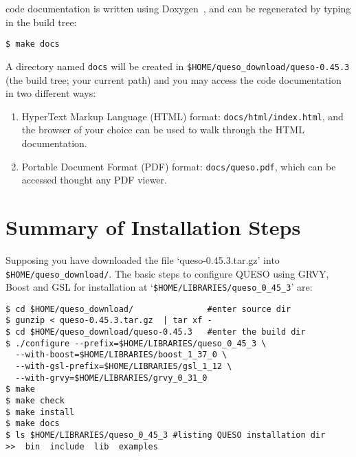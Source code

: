 \Queso{} code documentation is written using Doxygen~\cite{Doxygen}, and can be regenerated by typing in the build tree:
\begin{lstlisting}
$ make docs
\end{lstlisting}

A directory named \verb+docs+ will be created in \verb+$HOME/queso_download/queso-0.45.3+ (the build tree; your current path) and you may access the code documentation in two different ways:
\begin{enumerate}
 \item HyperText Markup Language (HTML)  format: \verb+docs/html/index.html+, and the browser of your choice can be used to walk through the HTML documentation.

\item Portable Document Format (PDF) format: \verb+docs/queso.pdf+, which can be accessed thought any PDF viewer.
\end{enumerate}
% 

\section{Summary of Installation Steps}\label{sec:summary}


Supposing you have downloaded the file `queso-0.45.3.tar.gz' into \texttt{\$HOME/queso\_download/}.
%
The basic steps to configure QUESO using GRVY, Boost and GSL for installation at \linebreak 
`\verb+$HOME/LIBRARIES/queso_0_45_3+'  are:

\begin{lstlisting}
$ cd $HOME/queso_download/               #enter source dir
$ gunzip < queso-0.45.3.tar.gz  | tar xf -
$ cd $HOME/queso_download/queso-0.45.3   #enter the build dir
$ ./configure --prefix=$HOME/LIBRARIES/queso_0_45_3 \
  --with-boost=$HOME/LIBRARIES/boost_1_37_0 \
  --with-gsl-prefix=$HOME/LIBRARIES/gsl_1_12 \
  --with-grvy=$HOME/LIBRARIES/grvy_0_31_0 
$ make 
$ make check
$ make install 
$ make docs
$ ls $HOME/LIBRARIES/queso_0_45_3 #listing QUESO installation dir
>>  bin  include  lib  examples
\end{lstlisting}

